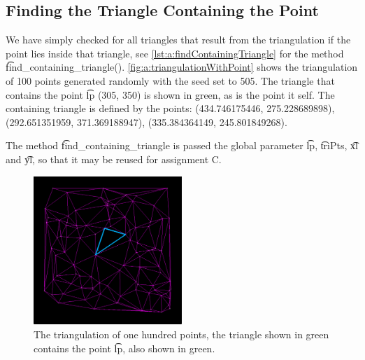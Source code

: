 \subsection*{Finding the Triangle Containing the Point}
We have simply checked for all triangles that result from the triangulation if the point lies inside that triangle, see \autoref{lst:a:findContainingTriangle} for the method \t{find_containing_triangle()}. \autoref{fig:a:triangulationWithPoint} shows the triangulation of 100 points generated randomly with the seed set to 505. The triangle that contains the point \t{lp} (305, 350) is shown in green, as is the point it self. The containing triangle is defined by the points: (\num{434.746175446}, \num{275.228689898}), (\num{292.651351959}, \num{371.369188947}), (\num{335.384364149}, \num{245.801849268}).

The method \t{find_containing_triangle} is passed the global parameter \t{lp}, \t{triPts}, \t{xl} and \t{yl}, so that it may be reused for assignment C.

\begin{figure}
	\centering
	\includegraphics[width=0.5\textwidth]{./img/a_triangulationWithPoint}
	\caption{The triangulation of one hundred points, the triangle shown in green contains the point \t{lp}, also shown in green.}
	\label{fig:a:triangulationWithPoint}
\end{figure}


